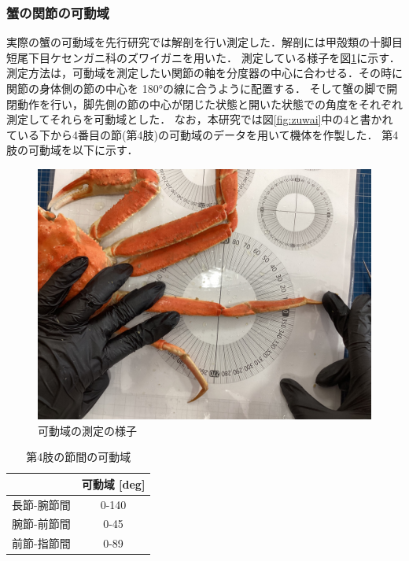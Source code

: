 \subsubsection{蟹の関節の可動域}
実際の蟹の可動域を先行研究では解剖を行い測定した．解剖には甲殻類の十脚目短尾下目ケセンガニ科のズワイガニを用いた．
測定している様子を図\ref{fig:sokutei}に示す．測定方法は，可動域を測定したい関節の軸を分度器の中心に合わせる．その時に関節の身体側の節の中心を 180°の線に合うように配置する．
そして蟹の脚で開閉動作を行い，脚先側の節の中心が閉じた状態と開いた状態での角度をそれぞれ測定してそれらを可動域とした．
なお，本研究では図\ref{fig:zuwai}中の4と書かれている下から4番目の節(第4肢)の可動域のデータを用いて機体を作製した．
第4肢の可動域を以下に示す．
\begin{figure}[t]
  \centering
  \includegraphics[scale=0.05]{image/degree_jikken.jpg}
  \caption{可動域の測定の様子}
  \label{fig:sokutei}
\end{figure}
\begin{table}[!t]
  \centering
  \vspace{5mm}
  \caption{第4肢の節間の可動域}
  \label{tab:4setukadou}
  \vspace{-3mm}
  \begin{tabular}{|l|c|}
  \hline
         & \multicolumn{1}{l|}{可動域 {[}deg{]}} \\ \hline
  長節-腕節間 & 0-140                            \\ \hline
  腕節-前節間 & 0-45                             \\ \hline
  前節-指節間 & 0-89                            \\ \hline
  \end{tabular}
\end{table}
